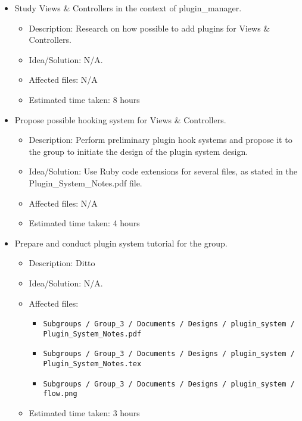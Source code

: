 \documentclass{article}
\begin{document}
\begin{itemize}
	\item Study Views \& Controllers in the context of plugin\_manager.
		\begin{itemize}
			\item Description: Research on how possible to add plugins for Views \& Controllers.
			\item Idea/Solution: N/A. 
			\item Affected files: N/A
			\item Estimated time taken: 8 hours
		\end{itemize}
	\item Propose possible hooking system for Views \& Controllers.
		\begin{itemize}
			\item Description: Perform preliminary plugin hook systems and propose it to the group to initiate the design of the plugin system design.
			\item Idea/Solution: Use Ruby code extensions for several files, as stated in the Plugin\_System\_Notes.pdf file. 
			\item Affected files: N/A
			\item Estimated time taken: 4 hours
		\end{itemize}
	\item Prepare and conduct plugin system tutorial for the group.
		\begin{itemize}
			\item Description: Ditto
			\item Idea/Solution: N/A. 
			\item Affected files: 
					\begin{itemize}
						\item \tt{Subgroups / Group\_3 / Documents / Designs / plugin\_system / Plugin\_System\_Notes.pdf}
						\item \tt{Subgroups / Group\_3 / Documents / Designs / plugin\_system / Plugin\_System\_Notes.tex}
						\item \tt{Subgroups / Group\_3 / Documents / Designs / plugin\_system / flow.png}
					\end{itemize}
			\item Estimated time taken: 3 hours
		\end{itemize}
\end{itemize}
\end{document}
